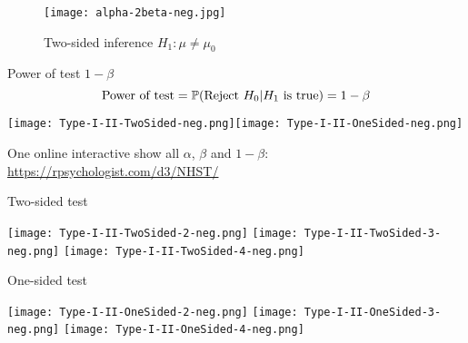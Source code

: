 \begin{frame}
\begin{figure}
 \texttt{[image: alpha-2beta-neg.jpg]}
 \caption{Two-sided inference $H_1: \mu\ne \mu_0$}
 \end{figure}
\end{frame}
\begin{frame}{Power of test $1-\beta$}
 \[
 \text{Power of test} = \mathbb{P}(\text{Reject $H_0$}| \text{$H_1$ is true}) = 1-\beta
 \]
 \vfill
 \begin{center}
  \texttt{[image: Type-I-II-TwoSided-neg.png]}\texttt{[image: Type-I-II-OneSided-neg.png]}
 \end{center}
 \vfill
 \centering
 One online interactive show all $\alpha$, $\beta$ and $1-\beta$:\\
 \url{https://rpsychologist.com/d3/NHST/}
\end{frame}
\begin{frame}{Two-sided test}
\def\a{0.27}
 \begin{overlayarea}{\textwidth}{\textheight}
 \begin{center}
	 \texttt{[image: Type-I-II-TwoSided-2-neg.png]}
	 \texttt{[image: Type-I-II-TwoSided-3-neg.png]}
	 \texttt{[image: Type-I-II-TwoSided-4-neg.png]}
 \end{center}
 \end{overlayarea}
\end{frame}
\begin{frame}{One-sided test}
\def\a{0.27}
 \begin{overlayarea}{\textwidth}{\textheight}
 \begin{center}
	 \texttt{[image: Type-I-II-OneSided-2-neg.png]}
	 \texttt{[image: Type-I-II-OneSided-3-neg.png]}
	 \texttt{[image: Type-I-II-OneSided-4-neg.png]}
 \end{center}
 \end{overlayarea}
\end{frame}
